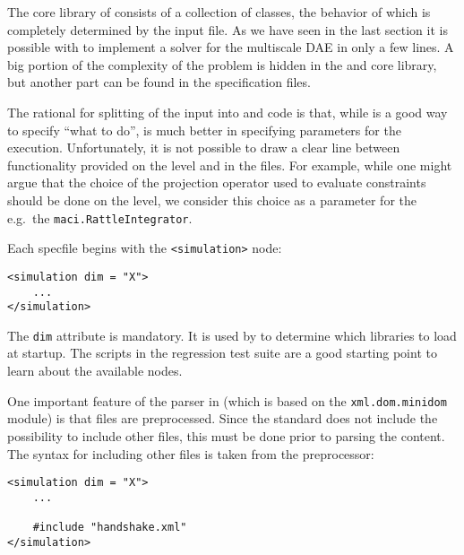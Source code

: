 
The core \PYTHON library of \MACI consists of a collection of \PYTHON classes, the behavior of which is completely determined by the \XML input file. As we have seen in the last section it is possible with \MACI to implement a solver for the multiscale DAE in only a few lines. A big portion of the complexity of the problem is hidden in the \CPP and \PYTHON core library, but another part can be found in the \XML specification files.\newline

The rational for splitting of the \MACI input into \PYTHON and \XML code is that, while \PYTHON is a good way to specify ``what to do'', \XML is much better in specifying parameters for the execution. Unfortunately, it is not possible to draw a clear line between functionality provided on the \PYTHON level and in the \XML files. For example, while one might argue that the choice of the projection operator used to evaluate constraints should be done on the \PYTHON level, we consider this choice as a parameter for the e.g.~the \lstinline[style=PYTHON]|maci.RattleIntegrator|.\newline

Each \MACI specfile begins with the \lstinline[style=XML]|<simulation>| node:

\begin{lstlisting}[style=XML_SMALL,frame=lines]
<simulation dim = "X">
	...
</simulation>
\end{lstlisting}

The \lstinline[style=XML]|dim| attribute is mandatory. It is used by \MACI to determine which libraries to load at startup. The scripts in the regression test suite are a good starting point to learn about the available \XML nodes.\newline

One important feature of the \XML parser in \MACI (which is based on the \lstinline[style=PYTHON]|xml.dom.minidom| \PYTHON module) is that \XML files are preprocessed. Since the \XML standard does not include the possibility to include other \XML files, this must be done prior to parsing the \XML content. The syntax for including other \XML files is taken from the \C preprocessor:

\begin{lstlisting}[style=XML_SMALL,frame=lines]
<simulation dim = "X">
	...
	
	#include "handshake.xml"
</simulation>
\end{lstlisting}

